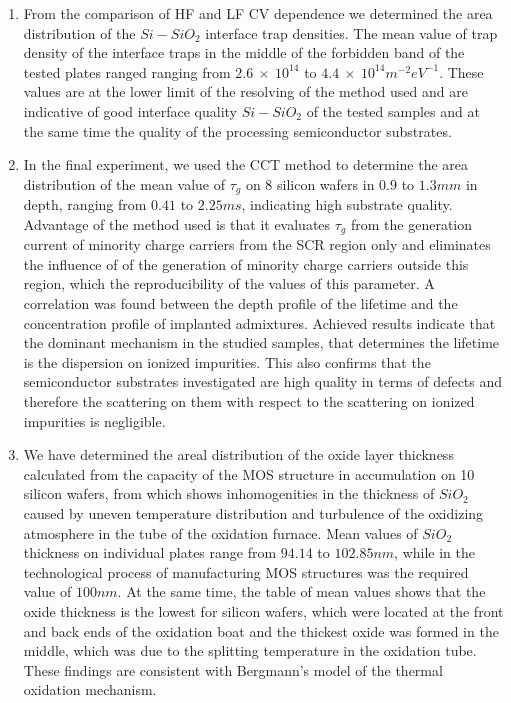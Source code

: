 \begin{enumerate}
\item From the comparison of HF and LF CV dependence we determined the
  area distribution of the $Si-SiO_{2}$ interface trap densities. The
  mean value of trap density of the interface traps in the middle of
  the forbidden band of the tested plates ranged ranging from
  $2.6\ \times\ 10^{14}$ to $4.4\ \times\ 10^{14}m^{-2}eV^{-1}$. These
  values are at the lower limit of the resolving of the method used
  and are indicative of good interface quality $Si-SiO_{2}$ of the
  tested samples and at the same time the quality of the processing
  semiconductor substrates.

\item In the final experiment, we used the CCT method to determine the
  area distribution of the mean value of $\tau_{g}$ on 8 silicon
  wafers in $0.9$ to $1.3 mm$ in depth, ranging from $0.41$ to $2.25
  ms$, indicating high substrate quality.
  \newline Advantage of the method used is that it evaluates
  $\tau_{g}$ from the generation current of minority charge carriers
  from the SCR region only and eliminates the influence of of the
  generation of minority charge carriers outside this region, which
  the reproducibility of the values of this parameter.
  \newline A correlation was found between the depth profile of the
  lifetime and the concentration profile of implanted
  admixtures. Achieved results indicate that the dominant mechanism in
  the studied samples, that determines the lifetime is the dispersion
  on ionized impurities. This also confirms that the semiconductor
  substrates investigated are high quality in terms of defects and
  therefore the scattering on them with respect to the scattering on
  ionized impurities is negligible.

\item We have determined the areal distribution of the oxide layer
  thickness calculated from the capacity of the MOS structure in
  accumulation on 10 silicon wafers, from which shows inhomogenities
  in the thickness of $SiO_{2}$ caused by uneven temperature
  distribution and turbulence of the oxidizing atmosphere in the tube
  of the oxidation furnace. \newline Mean values of $SiO_{2}$
  thickness on individual plates range from $94.14$ to $102.85 nm$,
  while in the technological process of manufacturing MOS structures
  was the required value of $100 nm$. \newline At the same time, the
  table of mean values shows that the oxide thickness is the lowest
  for silicon wafers, which were located at the front and back ends of
  the oxidation boat and the thickest oxide was formed in the middle,
  which was due to the splitting temperature in the oxidation
  tube. These findings are consistent with Bergmann's model of the
  thermal oxidation mechanism.


\end{enumerate}
